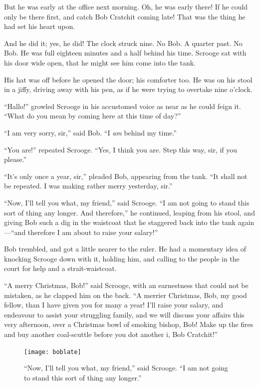 \documentclass[paper=5.5in:8.5in,BCOR=15mm,twoside,DIV=15,headinclude=off,12pt,chapterprefix=off,openany,headings=huge]{scrbook} %
\begin{document}
But he was early at the office next morning. Oh, he was early there! If he could only be there first, and catch Bob Cratchit coming late! That was the thing he had set his heart upon.

And he did it; yes, he did! The clock struck nine. No Bob. A quarter past. No Bob. He was full eighteen minutes and a half behind his time. Scrooge sat with his door wide open, that he might see him come into the tank.

His hat was off before he opened the door; his comforter too. He was on his stool in a jiffy, driving away with his pen, as if he were trying to overtake nine o'clock.

\enquote{Hallo!} growled Scrooge in his accustomed voice as near as he could feign it. \enquote{What do you mean by coming here at this time of day?}

\enquote{I am very sorry, sir,} said Bob. \enquote{I \textit{am} behind my time.}

\enquote{You are!} repeated Scrooge. \enquote{Yes, I think you are. Step this way, sir, if you please.}

\enquote{It's only once a year, sir,} pleaded Bob, appearing from the tank. \enquote{It shall not be repeated. I was making rather merry yesterday, sir.}

\enquote{Now, I'll tell you what, my friend,} said Scrooge. \enquote{I am not going to stand this sort of thing any longer. And therefore,} he continued, leaping from his stool, and giving Bob such a dig in the waistcoat that he staggered back into the tank again—\enquote{and therefore I am about to raise your salary!}

Bob trembled, and got a little nearer to the ruler. He had a momentary idea of knocking Scrooge down with it, holding him, and calling to the people in the court for help and a strait-waistcoat.

\enquote{A merry Christmas, Bob!} said Scrooge, with an earnestness that could not be mistaken, as he clapped him on the back. \enquote{A merrier Christmas, Bob, my good fellow, than I have given you for many a year! I'll raise your salary, and endeavour to assist your struggling family, and we will discuss your affairs this very afternoon, over a Christmas bowl of smoking bishop, Bob! Make up the fires and buy another coal-scuttle before you dot another i, Bob Cratchit!}

\begin{figure}[p]
\begin{minipage}[c]{\linewidth}
\texttt{[image: boblate]}
\caption*{\enquote{Now, I'll tell you what, my friend,} said Scrooge. \enquote{I am not going to stand this sort of thing any longer.}}
\end{minipage}
\end{figure}
\end{document}
